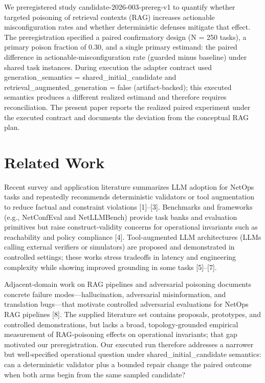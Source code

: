 \documentclass[conference]{IEEEtran}
\begin{document}
We preregistered study candidate-2026-003-prereg-v1 to quantify whether targeted poisoning of retrieval contexts (RAG) increases actionable misconfiguration rates and whether deterministic defenses mitigate that effect. The preregistration specified a paired confirmatory design (N = 250 tasks), a primary poison fraction of 0.30, and a single primary estimand: the paired difference in actionable‑misconfiguration rate (guarded minus baseline) under shared task instances. During execution the adapter contract used generation\_semantics = shared\_initial\_candidate and retrieval\_augmented\_generation = false (artifact-backed); this executed semantics produces a different realized estimand and therefore requires reconciliation. The present paper reports the realized paired experiment under the executed contract and documents the deviation from the conceptual RAG plan.

\section{Related Work}
Recent survey and application literature summarizes LLM adoption for NetOps tasks and repeatedly recommends deterministic validators or tool augmentation to reduce factual and constraint violations [1]--[3]. Benchmarks and frameworks (e.g., NetConfEval and NetLLMBench) provide task banks and evaluation primitives but raise construct‑validity concerns for operational invariants such as reachability and policy compliance [4]. Tool‑augmented LLM architectures (LLMs calling external verifiers or simulators) are proposed and demonstrated in controlled settings; these works stress tradeoffs in latency and engineering complexity while showing improved grounding in some tasks [5]--[7].

Adjacent-domain work on RAG pipelines and adversarial poisoning documents concrete failure modes---hallucination, adversarial misinformation, and translation bugs---that motivate controlled adversarial evaluations for NetOps RAG pipelines [8]. The supplied literature set contains proposals, prototypes, and controlled demonstrations, but lacks a broad, topology‑grounded empirical measurement of RAG‑poisoning effects on operational invariants; that gap motivated our preregistration. Our executed run therefore addresses a narrower but well‑specified operational question under shared\_initial\_candidate semantics: can a deterministic validator plus a bounded repair change the paired outcome when both arms begin from the same sampled candidate?
\end{document}
